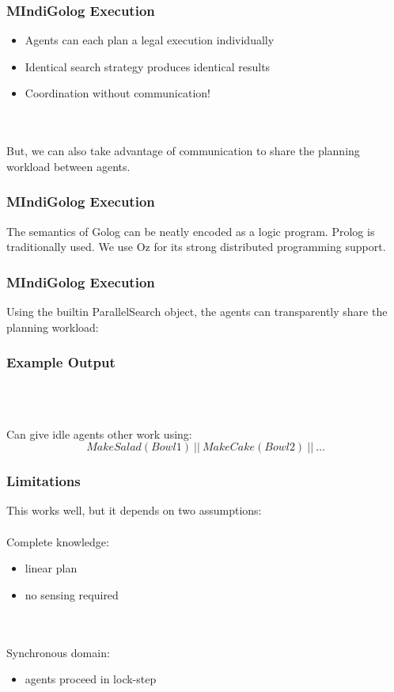 \documentclass{beamer}
\begin{document}
\begin{frame}
\frametitle{MIndiGolog Execution}
\begin{itemize}
 \item Agents can each plan a legal execution individually
 \item Identical search strategy produces identical results
 \item Coordination without communication!
\end{itemize}
\ \\
\ \\
But, we can also take advantage of communication to share the planning
workload between agents.
\end{frame}

\begin{frame}
\frametitle{MIndiGolog Execution}
The semantics of Golog can be neatly encoded as a logic program.
Prolog is traditionally used.
We use Oz for its strong distributed programming support.


\end{frame}

\begin{frame}
\frametitle{MIndiGolog Execution}
Using the builtin ParallelSearch object, the agents can transparently
share the planning workload:


\end{frame}

\begin{frame}
\frametitle{Example Output}
\begin{columns}
  \begin{column}{0.5\textwidth}
  \end{column}
  \begin{column}{0.5\textwidth}
  \end{column}
\end{columns}
\ \\
\ \\
\pause
Can give idle agents other work using:\[
MakeSalad(Bowl1)\ ||\ MakeCake(Bowl2)\ ||\ \dots\]
\end{frame}

\begin{frame}
\frametitle{Limitations}
This works well, but it depends on two assumptions:
\ \\
\ \\
\pause
Complete knowledge:
\begin{itemize}
\item linear plan
\item no sensing required
\end{itemize}
\ \\
\ \\
\pause
Synchronous domain:
\begin{itemize}
\item agents proceed in lock-step
\end{itemize}
\end{frame}
\end{document}
